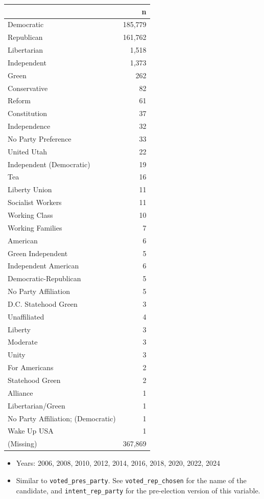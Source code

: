 \documentclass[10pt,article,oneside]{memoir}
\begin{document}
\begin{table}[H]
\centering
\begin{tabular}[t]{lr}
\toprule
 & n\\
\midrule
Democratic & 185,779\\
Republican & 161,762\\
Libertarian & 1,518\\
Independent & 1,373\\
Green & 262\\
Conservative & 82\\
Reform & 61\\
Constitution & 37\\
Independence & 32\\
No Party Preference & 33\\
United Utah & 22\\
Independent (Democratic) & 19\\
Tea & 16\\
Liberty Union & 11\\
Socialist Workers & 11\\
Working Class & 10\\
Working Families & 7\\
American & 6\\
Green Independent & 5\\
Independent American & 6\\
Democratic-Republican & 5\\
No Party Affiliation & 5\\
D.C. Statehood Green & 3\\
Unaffiliated & 4\\
Liberty & 3\\
Moderate & 3\\
Unity & 3\\
For Americans & 2\\
Statehood Green & 2\\
Alliance & 1\\
Libertarian/Green & 1\\
No Party Affiliation; (Democratic) & 1\\
Wake Up USA & 1\\
(Missing) & 367,869\\
\bottomrule
\end{tabular}
\end{table}

\begin{itemize}
\tightlist
\item
  Years: 2006, 2008, 2010, 2012, 2014, 2016, 2018, 2020, 2022, 2024
\item
  Similar to \texttt{voted\_pres\_party}. See
  \texttt{voted\_rep\_chosen} for the name of the candidate, and
  \texttt{intent\_rep\_party} for the pre-election version of this
  variable.
\end{itemize}
\end{document}
